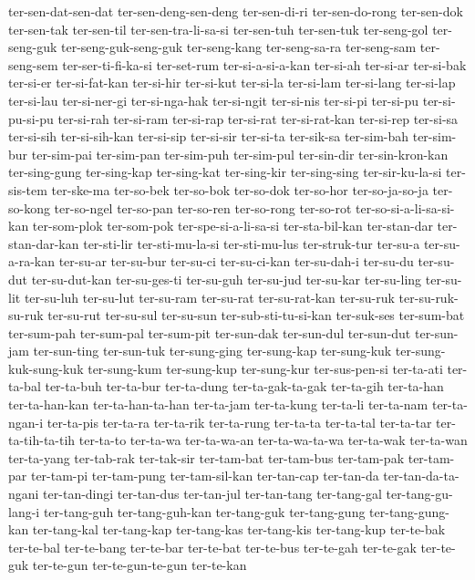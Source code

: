 {ter-sen-dat-sen-dat ter-sen-deng-sen-deng ter-sen-di-ri ter-sen-do-rong
ter-sen-dok ter-sen-tak ter-sen-til ter-sen-tra-li-sa-si ter-sen-tuh
ter-sen-tuk ter-seng-gol ter-seng-guk ter-seng-guk-seng-guk ter-seng-kang
ter-seng-sa-ra ter-seng-sam ter-seng-sem ter-ser-ti-fi-ka-si ter-set-rum
ter-si-a-si-a-kan ter-si-ah ter-si-ar ter-si-bak ter-si-er ter-si-fat-kan
ter-si-hir ter-si-kut ter-si-la ter-si-lam ter-si-lang ter-si-lap
ter-si-lau ter-si-ner-gi ter-si-nga-hak ter-si-ngit ter-si-nis ter-si-pi
ter-si-pu ter-si-pu-si-pu ter-si-rah ter-si-ram ter-si-rap ter-si-rat
ter-si-rat-kan ter-si-rep ter-si-sa ter-si-sih ter-si-sih-kan ter-si-sip
ter-si-sir ter-si-ta ter-sik-sa ter-sim-bah ter-sim-bur ter-sim-pai
ter-sim-pan ter-sim-puh ter-sim-pul ter-sin-dir ter-sin-kron-kan
ter-sing-gung ter-sing-kap ter-sing-kat ter-sing-kir ter-sing-sing
ter-sir-ku-la-si ter-sis-tem ter-ske-ma ter-so-bek ter-so-bok ter-so-dok
ter-so-hor ter-so-ja-so-ja ter-so-kong ter-so-ngel ter-so-pan ter-so-ren
ter-so-rong ter-so-rot ter-so-si-a-li-sa-si-kan ter-som-plok ter-som-pok
ter-spe-si-a-li-sa-si ter-sta-bil-kan ter-stan-dar ter-stan-dar-kan
ter-sti-lir ter-sti-mu-la-si ter-sti-mu-lus ter-struk-tur ter-su-a
ter-su-a-ra-kan ter-su-ar ter-su-bur ter-su-ci ter-su-ci-kan ter-su-dah-i
ter-su-du ter-su-dut ter-su-dut-kan ter-su-ges-ti ter-su-guh ter-su-jud
ter-su-kar ter-su-ling ter-su-lit ter-su-luh ter-su-lut ter-su-ram
ter-su-rat ter-su-rat-kan ter-su-ruk ter-su-ruk-su-ruk ter-su-rut
ter-su-sul ter-su-sun ter-sub-sti-tu-si-kan ter-suk-ses ter-sum-bat
ter-sum-pah ter-sum-pal ter-sum-pit ter-sun-dak ter-sun-dul ter-sun-dut
ter-sun-jam ter-sun-ting ter-sun-tuk ter-sung-ging ter-sung-kap
ter-sung-kuk ter-sung-kuk-sung-kuk ter-sung-kum ter-sung-kup ter-sung-kur
ter-sus-pen-si ter-ta-ati ter-ta-bal ter-ta-buh ter-ta-bur ter-ta-dung
ter-ta-gak-ta-gak ter-ta-gih ter-ta-han ter-ta-han-kan ter-ta-han-ta-han
ter-ta-jam ter-ta-kung ter-ta-li ter-ta-nam ter-ta-ngan-i ter-ta-pis
ter-ta-ra ter-ta-rik ter-ta-rung ter-ta-ta ter-ta-tal ter-ta-tar
ter-ta-tih-ta-tih ter-ta-to ter-ta-wa ter-ta-wa-an ter-ta-wa-ta-wa
ter-ta-wak ter-ta-wan ter-ta-yang ter-tab-rak ter-tak-sir ter-tam-bat
ter-tam-bus ter-tam-pak ter-tam-par ter-tam-pi ter-tam-pung
ter-tam-sil-kan ter-tan-cap ter-tan-da ter-tan-da-ta-ngani ter-tan-dingi
ter-tan-dus ter-tan-jul ter-tan-tang ter-tang-gal ter-tang-gu-lang-i
ter-tang-guh ter-tang-guh-kan ter-tang-guk ter-tang-gung ter-tang-gung-kan
ter-tang-kal ter-tang-kap ter-tang-kas ter-tang-kis ter-tang-kup
ter-te-bak ter-te-bal ter-te-bang ter-te-bar ter-te-bat ter-te-bus
ter-te-gah ter-te-gak ter-te-guk ter-te-gun ter-te-gun-te-gun ter-te-kan
}
